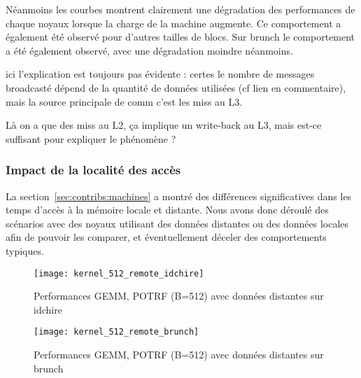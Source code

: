 Néanmoins les courbes montrent clairement une dégradation des performances de chaque noyaux lorsque la charge de la machine augmente.
Ce comportement a également été observé pour d'autres tailles de blocs. Sur brunch le comportement a été également observé, avec une dégradation moindre néanmoins.

\begin{todo}
  ici l'explication est toujours pas évidente : certes le nombre de messages broadcasté dépend de la quantité de données utilisées (cf lien en commentaire), mais la source principale de comm c'est les miss au L3.
  
  Là on a que des miss au L2, ça implique un write-back au L3, mais est-ce suffisant pour expliquer le phénomène ?
\end{todo}

\subsubsection{Impact de la localité des accès}\label{sec:contribs:apps:cholesky:locality}

La section~\ref{sec:contribs:machines} a montré des différences significatives dans les temps d'accès à la mémoire locale et distante.
Nous avons donc déroulé des scénarios avec des noyaux utilisant des données distantes ou des données locales afin de pouvoir les comparer, et éventuellement déceler des comportements typiques.

\begin{figure}[t!]
  \centering
  \texttt{[image: kernel\_512\_remote\_idchire]}
  \caption{Performances GEMM, POTRF (B=512) avec données distantes sur idchire}\label{fig:contribs:apps:cholesky:perf-512-remote-idchire}
\end{figure}
\begin{figure}[h!]
  \centering
  \texttt{[image: kernel\_512\_remote\_brunch]}
  \caption{Performances GEMM, POTRF (B=512) avec données distantes sur brunch}\label{fig:contribs:apps:cholesky:perf-512-remote-brunch}
\end{figure}

